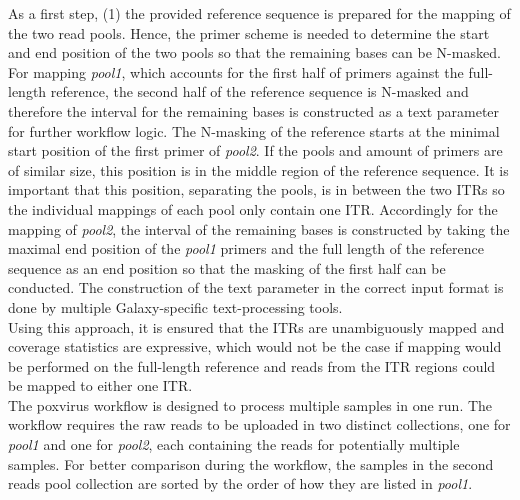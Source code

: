 As a first step, (1) the provided reference sequence is prepared for the mapping of the two read pools. Hence, the primer scheme is needed to determine the start and end position of the two pools so that the remaining bases can be N-masked. For mapping \textit{pool1}, which accounts for the first half of primers against the full-length reference, the second half of the reference sequence is N-masked and therefore the interval for the remaining bases is constructed as a text parameter for further workflow logic. The N-masking of the reference starts at the minimal start position of the first primer of \textit{pool2}. If the pools and amount of primers are of similar size, this position is in the middle region of the reference sequence. It is important that this position, separating the pools, is in between the two \acp{ITR} so the individual mappings of each pool only contain one \ac{ITR}. Accordingly for the mapping of \textit{pool2}, the interval of the remaining bases is constructed by taking the maximal end position of the \textit{pool1} primers and the full length of the reference sequence as an end position so that the masking of the first half can be conducted. The construction of the text parameter in the correct input format is done by multiple Galaxy-specific text-processing tools.\\
Using this approach, it is ensured that the \acp{ITR} are unambiguously mapped and coverage statistics are expressive, which would not be the case if mapping would be performed on the full-length reference and reads from the \ac{ITR} regions could be mapped to either one \ac{ITR}. \\
The poxvirus workflow is designed to process multiple samples in one run. The workflow requires the raw reads to be uploaded in two distinct collections, one for \textit{pool1} and one for \textit{pool2}, each containing the reads for potentially multiple samples. For better comparison during the workflow, the samples in the second reads pool collection are sorted by the order of how they are listed in \textit{pool1}.\\
